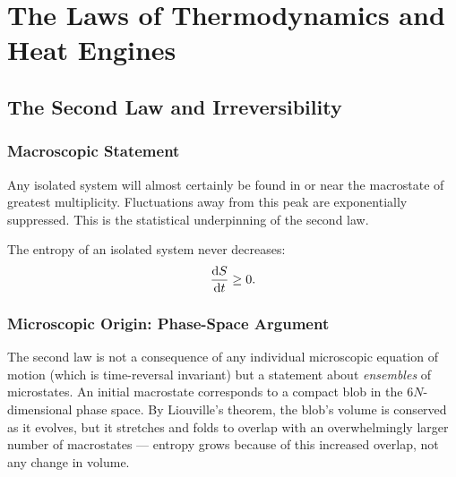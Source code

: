 
\chapter{The Laws of Thermodynamics and Heat Engines}

\section{The Second Law and Irreversibility}

\subsection{Macroscopic Statement}

Any isolated system will almost certainly be found in or near the macrostate of greatest multiplicity. Fluctuations away from this peak are exponentially suppressed. This is the statistical underpinning of the second law.

\begin{theorem}
The entropy of an isolated system never decreases:
\[
    \dv{S}{t} \geq 0.
\]
\end{theorem}

\subsection{Microscopic Origin: Phase-Space Argument}

The second law is not a consequence of any individual microscopic equation of motion (which is time-reversal invariant) but a statement about \emph{ensembles} of microstates. An initial macrostate corresponds to a compact blob in the $6N$-dimensional phase space. By Liouville's theorem, the blob's volume is conserved as it evolves, but it stretches and folds to overlap with an overwhelmingly larger number of macrostates --- entropy grows because of this increased overlap, not any change in volume.

